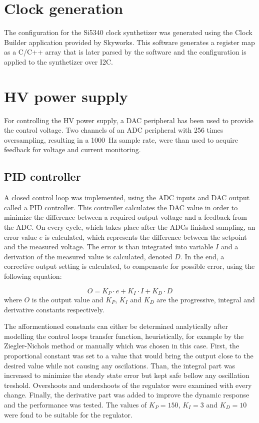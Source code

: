 \section{Clock generation}
The configuration for the Si5340 clock synthetizer was generated using the Clock Builder application provided by Skyworks. This software generates a register map as a C/C++ array that is later parsed by the software and the configuration is applied to the synthetizer over I2C.

\section{HV power supply}
For controlling the HV power supply, a DAC peripheral has been used to provide the control voltage. Two channels of an ADC peripheral with 256 times oversampling, resulting in a \SI{1000}{\hertz} sample rate, were than used to acquire feedback for voltage and current monitoring. 

\subsection{PID controller}
A closed control loop was implemented, using the ADC inputs and DAC output called a PID controller. This controller calculates the DAC value in order to minimize the difference between a required output voltage and a feedback from the ADC. On every cycle, which takes place after the ADCs finished sampling, an error value $e$ is calculated, which represents the difference between the setpoint and the measured voltage. The error is than integrated into variable $I$ and a derivation of the measured value is calculated, denoted $D$. In the end, a corrective output setting is calculated, to compensate for possible error, using the following equation:

\begin{equation}
    O = K_P \cdot e + K_I \cdot I + K_D \cdot D
\end{equation}
where $O$ is the output value and $K_P$, $K_I$ and $K_D$ are the progressive, integral and derivative constants respectively.

The afformentioned constants can either be determined analytically after modelling the control loops transfer function, heuristically, for example by the Ziegler-Nichols method or manually which was chosen in this case. First, the proportional constant was set to a value that would bring the output close to the desired value while not causing any oscilations. Than, the integral part was increased to minimize the steady state error but kept safe bellow any oscillation treshold. Overshoots and undershoots of the regulator were examined with every change. Finally, the derivative part was added to improve the dynamic response and the performance was tested. The values of $K_P = 150$, $K_I = 3$ and $K_D = 10$ were fond to be suitable for the regulator.
